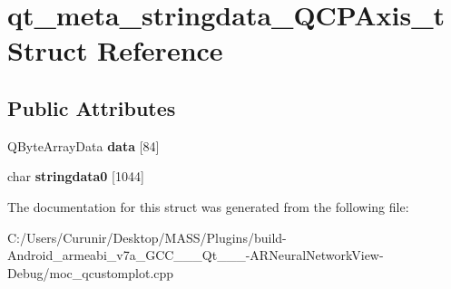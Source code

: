 \hypertarget{structqt__meta__stringdata___q_c_p_axis__t}{}\section{qt\+\_\+meta\+\_\+stringdata\+\_\+\+Q\+C\+P\+Axis\+\_\+t Struct Reference}
\label{structqt__meta__stringdata___q_c_p_axis__t}
\subsection*{Public Attributes}
\begin{DoxyCompactItemize}
\item 
\mbox{\label{structqt__meta__stringdata___q_c_p_axis__t_a374764f7a83ceca13170dc11f6a16f56}} 
Q\+Byte\+Array\+Data {\bfseries data} \mbox{[}84\mbox{]}
\item 
\mbox{\label{structqt__meta__stringdata___q_c_p_axis__t_af7d94e35cddbd63a5d28ede33659da0c}} 
char {\bfseries stringdata0} \mbox{[}1044\mbox{]}
\end{DoxyCompactItemize}


The documentation for this struct was generated from the following file\+:\begin{DoxyCompactItemize}
\item 
C\+:/\+Users/\+Curunir/\+Desktop/\+M\+A\+S\+S/\+Plugins/build-\/\+Android\+\_\+armeabi\+\_\+v7a\+\_\+\+G\+C\+C\+\_\+\_\+\_\+\+Qt\+\_\+\_\+\_-\/\+A\+R\+Neural\+Network\+View-\/\+Debug/moc\+\_\+qcustomplot.\+cpp\end{DoxyCompactItemize}
